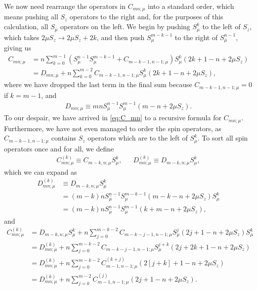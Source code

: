 \documentclass[aps,notitlepage,nofootinbib,11pt]{revtex4-1}
\newcommand{\p}[1]{\left(#1\right)} %
\renewcommand{\sp}[1]{\left[#1\right]} %
\newcommand{\bmu}{{\bar\mu}}
\newcommand{\1}{\mathds{1}}
\begin{document}
We now need rearrange the operators in $C_{mn;\mu}$ into a standard
order, which means pushing all $S_z$ operators to the right and, for
the purposes of this calculation, all $S_\bmu$ operators on the left.
We begin by pushing $S_\mu^k$ to the left of $S_z$, which takes
$2\mu S_z\to 2\mu S_z+2k$, and then push $S_\mu^{m-k-1}$ to the right
of $S_\bmu^{n-1}$, giving us
\begin{align}
  C_{mn;\mu}
  &= n \sum_{k=0}^{m-1}
  \p{S_\bmu^{n-1} S_\mu^{m-k-1} + C_{m-k-1,n-1;\mu}} S_\mu^k
  \p{2k + 1 - n + 2\mu S_z} \\
  &= D_{mn;\mu}
  + n \sum_{k=0}^{m-2} C_{m-k-1,n-1;\mu}
  S_\mu^k \p{2k + 1 - n + 2\mu S_z},
  \label{eq:C_mn}
\end{align}
where we have dropped the last term in the final sum because
$C_{m-k-1,n-1;\mu}=0$ if $k=m-1$, and
\begin{align}
  D_{mn;\mu}
  \equiv mn S_\bmu^{n-1} S_\mu^{m-1} \p{m - n + 2\mu S_z}.
  \label{eq:D_mn}
\end{align}
To our despair, we have arrived in \eqref{eq:C_mn} to a recursive
formula for $C_{mn;\mu}$.  Furthermore, we have not even managed to
order the spin operators, as $C_{m-k-1,n-1;\mu}$ contains $S_z$
operators which are to the left of $S_\mu^k$.  To sort all spin
operators once and for all, we define
\begin{align}
  C_{mn;\mu}^{(k)} \equiv C_{m-k,n;\mu} S_\mu^k,
  &&
  D_{mn;\mu}^{(k)} \equiv D_{m-k,n;\mu} S_\mu^k,
\end{align}
which we can expand as
\begin{align}
  D_{mn;\mu}^{(k)}
  &\equiv D_{m-k,n;\mu}S_\mu^k \\
  &= \p{m-k}n S_\bmu^{n-1} S_\mu^{m-k-1}
  \p{m-k-n+2\mu S_z} S_\mu^k \\
  &= \p{m-k}n S_\bmu^{n-1} S_\mu^{m-1} \p{k+m-n+2\mu S_z},
  \label{eq:D_mn_k}
\end{align}
and
\begin{align}
  C_{mn;\mu}^{(k)}
  &= D_{m-k,n;\mu} S_\mu^k + n \sum_{j=0}^{m-k-2}
  C_{m-k-j-1,n-1;\mu} S_\mu^j \p{2j+1-n+2\mu S_z} S_\mu^k \\
  &= D_{mn;\mu}^{(k)} + n \sum_{j=0}^{m-k-2}
  C_{m-k-j-1,n-1;\mu} S_\mu^{j+k} \p{2j+2k+1-n+2\mu S_z} \\
  &= D_{mn;\mu}^{(k)} + n \sum_{j=0}^{m-k-2}
  C_{m-1,n-1;\mu}^{(k+j)} \p{2\sp{j+k}+1-n+2\mu S_z} \\
  &= D_{mn;\mu}^{(k)} + n \sum_{j=k}^{m-2}
  C_{m-1,n-1;\mu}^{(j)} \p{2j+1-n+2\mu S_z}.
  \label{eq:C_mn_k}
\end{align}
\end{document}
